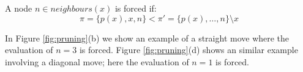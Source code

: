 \begin{definition}
\label{def:forced}
A node $n \in neighbours(x)$ is forced if: 
\begin{equation}
\pi = \lbrace p(x), x, n
\rbrace < \pi' = \lbrace p(x), \ldots, n \rbrace \setminus x
\end{equation}
\end{definition}
\par \noindent
In Figure \ref{fig:pruning}(b) we show an example of a straight move where 
the evaluation of $n = 3$ is forced. Figure \ref{fig:pruning}(d)  
shows an similar example involving a diagonal move; here the evaluation of
$n = 1$ is forced.
